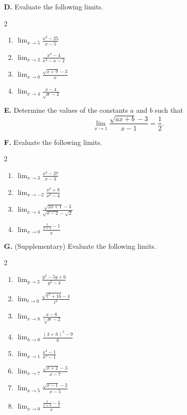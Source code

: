 \bigskip
\textbf{D.} Evaluate the following limits.

\begin{multicols}{2}
\begin{enumerate}[label=\arabic*., start=1, nosep, topsep=0pt, itemsep=2pt]
    \item \(\displaystyle\lim_{x \to 5} \frac{x^{2} - 25}{x - 5}\)
    \item \(\displaystyle\lim_{x \to 2} \frac{x^{2} - 4}{x^{2} - x - 2}\)
    \item \(\displaystyle\lim_{x \to 0} \frac{\sqrt{x + 9} - 3}{x}\)
    \item \(\displaystyle\lim_{x \to 4} \frac{x - 4}{\sqrt{x} - 2}\)
\end{enumerate}
\end{multicols}

\bigskip
\textbf{E.} Determine the values of the constants \(a\) and \(b\) such that
\[
\lim_{x \to 1} \frac{\sqrt{ax + b} - 3}{x - 1} = \frac{1}{2}.
\]

\pagebreak
\textbf{F.} Evaluate the following limits.

\begin{multicols}{2}
\begin{enumerate}[label=\arabic*., start=1, nosep, topsep=0pt, itemsep=2pt]
    \item \(\displaystyle\lim_{x \to 3} \frac{x^{3} - 27}{x - 3}\)
    \item \(\displaystyle\lim_{x \to -2} \frac{x^{3} + 8}{x^{2} - 4}\)
    \item \(\displaystyle\lim_{x \to 4} \frac{\sqrt{2x + 1} - 3}{\sqrt{x - 2} - \sqrt{2}}\)
    \item \(\displaystyle\lim_{x \to 0} \frac{\frac{1}{x + 1} - 1}{x}\)
\end{enumerate}
\end{multicols}

\bigskip
\textbf{G.} (Supplementary) Evaluate the following limits.

\begin{multicols}{2}
\begin{enumerate}[label=\arabic*., start=1, nosep, topsep=0pt, itemsep=2pt]
    \item \(\displaystyle\lim_{y \to 2} \frac{y^{2} - 5y + 6}{y^{2} - 4}\)
    \item \(\displaystyle\lim_{t \to 0} \frac{\sqrt{t^{2} + 16} - 4}{t^{2}}\)
    \item \(\displaystyle\lim_{x \to 8} \frac{x - 8}{\sqrt[3]{x} - 2}\)
    \item \(\displaystyle\lim_{h \to 0} \frac{(3 + h)^{2} - 9}{h}\)
    \item \(\displaystyle\lim_{x \to 1} \frac{x^{4} - 1}{x^{3} - 1}\)
    \item \(\displaystyle\lim_{x \to 7} \frac{\sqrt{x + 2} - 3}{x - 7}\)
    \item \(\displaystyle\lim_{x \to 5} \frac{\sqrt{x - 1} - 2}{x - 5}\)
    \item \(\displaystyle\lim_{x \to 0} \frac{\frac{1}{x + 2} - \frac{1}{2}}{x}\)
\end{enumerate}
\end{multicols}


